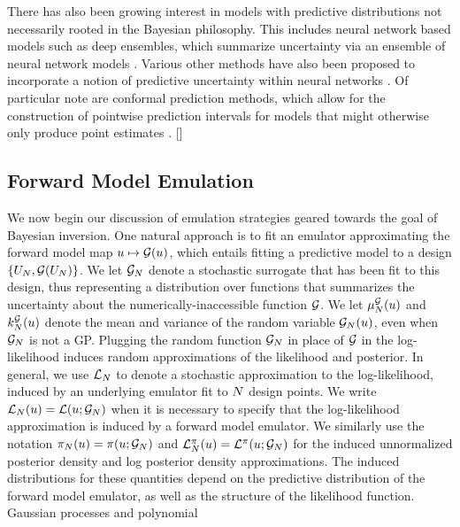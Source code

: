\documentclass[12pt]{article}
\begin{document}
There has also been growing interest in models with predictive distributions not necessarily 
rooted in the Bayesian philosophy. This includes neural network based models such 
as deep ensembles, which summarize uncertainty via an ensemble of neural network 
models \citep{deepEnsembles}. Various other methods have also been proposed to 
incorporate a notion of predictive uncertainty within neural networks \citep{epistemicNN}.
Of particular note are conformal prediction methods, which allow for the construction of 
pointwise prediction intervals for models that might otherwise only produce point 
estimates \citep{conformalSurrogate,conformalGP,conformalTwoStageDesign,conformalEvidentialSurrogate,conformalBayesOpt}.
[]

\subsection{Forward Model Emulation}
We now begin our discussion of emulation strategies geared towards the goal of Bayesian inversion.
One natural approach is to fit an emulator approximating the forward model map $\Par \mapsto \fwd(\Par)$,
which entails fitting a predictive model to a design $\{\designIn, \fwd(\designIn)\}$. 
We let $\fwdEm[\Ndesign]$ denote a stochastic surrogate that has been fit to this design,
thus representing a distribution over functions that summarizes the uncertainty about the 
numerically-inaccessible function $\fwd$. We let $\emMean[\Ndesign]{\fwd}(\Par)$ and 
$\emKer[\Ndesign]{\fwd}(\Par)$ denote the mean and variance of the random 
variable $\fwdEm[\Ndesign](\Par)$, even when $\fwdEm[\Ndesign]$ is not a GP.
Plugging the random function $\fwdEm[\Ndesign]$ in place of $\fwd$ in the log-likelihood 
induces random approximations of the likelihood and posterior. In general, we use 
$\llikEm[\Ndesign]$ to denote a stochastic approximation to the log-likelihood, induced
by an underlying emulator fit to $\Ndesign$ design points. We write 
$\llikEm[\Ndesign](\Par) = \llik(\Par; \fwdEm[\Ndesign])$ when it is necessary to specify that
the log-likelihood approximation is induced by a forward model emulator. We similarly use 
the notation $\postEm(\Par) = \postDens(\Par; \fwdEm[\Ndesign])$ and 
$\lpostEm(\Par) = \lpost(\Par; \fwdEm[\Ndesign])$ for the induced unnormalized 
posterior density and log posterior density approximations. The induced distributions for 
these quantities depend on the predictive distribution of the forward model emulator, as
well as the structure of the likelihood function. Gaussian processes and polynomial 
\end{document}
